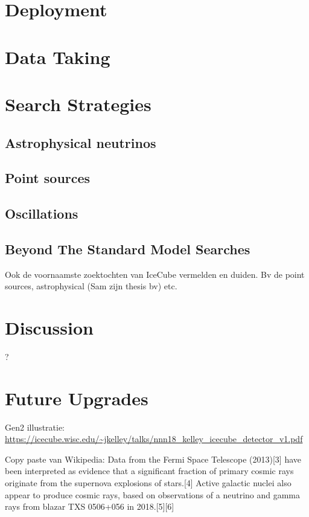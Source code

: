 \section{Deployment}

\section{Data Taking}

\section{Search Strategies}
\subsection{Astrophysical neutrinos}
\subsection{Point sources}
\subsection{Oscillations}
\subsection{Beyond The Standard Model Searches}

Ook de voornaamste zoektochten van IceCube vermelden en duiden. Bv de point sources, astrophysical (Sam zijn thesis bv) etc.

\section{Discussion}
?

\section{Future Upgrades}
Gen2 illustratie: \url{https://icecube.wisc.edu/~jkelley/talks/nnn18_kelley_icecube_detector_v1.pdf}






Copy paste van Wikipedia:
 Data from the Fermi Space Telescope (2013)[3] have been interpreted as evidence that a significant fraction of primary cosmic rays originate from the supernova explosions of stars.[4] Active galactic nuclei also appear to produce cosmic rays, based on observations of a neutrino and gamma rays from blazar TXS 0506+056 in 2018.[5][6]
 

